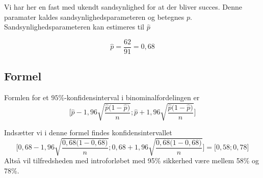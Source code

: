 \documentclass[11pt, a4paper]{article}
\begin{document}
Vi har her en fast med ukendt sandsynlighed for at der bliver succes. Denne
paramater kaldes sandsynlighedsparameteren og betegnes \(p\).
Sandsynlighedsparameteren kan estimeres til \(\widehat{p}\)

\begin{equation}
  \widehat{p} = \frac{62}{91} = 0,68
\end{equation}

\subsection{Formel}
Formlen for et  \(95\%\)-konfidens\-interval i binominalfordelingen er
\begin{equation}
  \Bigg[ \widehat{p} - 1,96 \sqrt{\frac{\widehat{p}\big(1-\widehat{p}\big)}{n}} ;
  \widehat{p} + 1,96 \sqrt{\frac{\widehat{p}\big(1-\widehat{p}\big)}{n}} \Bigg]
\end{equation}

Indsætter vi i denne formel findes konfidensintervallet
\begin{equation}
  \Bigg[ 0,68 - 1,96 \sqrt{\frac{0,68\big(1-0,68\big)}{n}} ;
  0,68 + 1,96 \sqrt{\frac{0,68\big(1-0,68\big)}{n}} \Bigg] =
  \Big[0,58  ; 0,78  \Big]
\end{equation}
Altså vil tilfredsheden med introforløbet med 95\% sikkerhed være mellem 58\% og
78\%.
\end{document}
